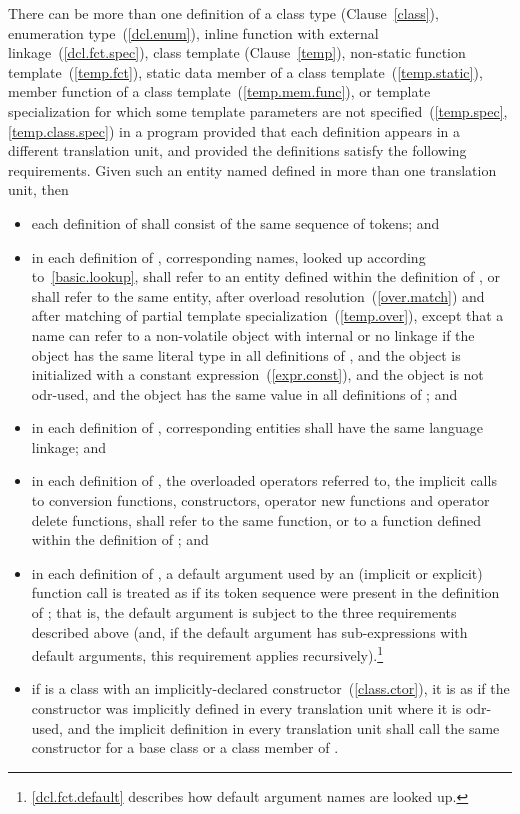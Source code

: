 \pnum
There can be more than one definition of a class type
(Clause~\ref{class}), enumeration type~(\ref{dcl.enum}), inline function
with external linkage~(\ref{dcl.fct.spec}), class template
(Clause~\ref{temp}), non-static function template~(\ref{temp.fct}),
static data member of a class template~(\ref{temp.static}), member
function of a class template~(\ref{temp.mem.func}), or template
specialization for which some template parameters are not
specified~(\ref{temp.spec}, \ref{temp.class.spec}) in a program provided
that each definition appears in a different translation unit, and
provided the definitions satisfy the following requirements. Given such
an entity named  defined in more than one translation unit,
then
\begin{itemize}
\item each definition of  shall consist of the same sequence of
tokens; and
\item in each definition of , corresponding names, looked up
according to~\ref{basic.lookup}, shall refer to an entity defined within
the definition of , or shall refer to the same entity, after
overload resolution~(\ref{over.match}) and after matching of partial
template specialization~(\ref{temp.over}), except that a name can refer
to a non-volatile  object with internal or no linkage if the
object has the same literal type in all definitions of ,
and the object is initialized with a constant
expression~(\ref{expr.const}), and the object is not odr-used, and the object
has the same value in all definitions of ; and
\item in each definition of , corresponding entities shall have the
same language linkage; and
\item in each definition of , the overloaded operators referred
to, the implicit calls to conversion functions, constructors, operator
new functions and operator delete functions, shall refer to the same
function, or to a function defined within the definition of ;
and
\item in each definition of , a default argument used by an
(implicit or explicit) function call is treated as if its token sequence
were present in the definition of ; that is, the default
argument is subject to the three requirements described above (and, if
the default argument has sub-expressions with default arguments, this
requirement applies recursively).\footnote{\ref{dcl.fct.default} 
describes how default argument names are looked up.}
\item if  is a class with an implicitly-declared
constructor~(\ref{class.ctor}), it is as if the constructor was
implicitly defined in every translation unit where it is odr-used, and the
implicit definition in every translation unit shall call the same
constructor for a base class or a class member of .
\enterexample


\end{itemize}
